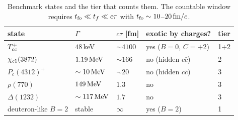 \begin{table}[t]
\caption{Benchmark states and the tier that counts them.  The countable
window requires $t_{\rm fo}\ll t_f\ll c\tau$ with
$t_{\rm fo}\sim10$--$20\,\mathrm{fm}/c$.}
\label{tab:tiers}
\begin{ruledtabular}
\begin{tabular}{lllll}
state & $\Gamma$ & $c\tau$ [fm] & exotic by charges? & tier \\
\hline
$T_{cc}^{+}$          & $48\,$keV      & $\sim4100$ & yes ($B{=}0$, $C{=}{+}2$) & 1+2 \\
$\chi_{c1}(3872)$         & $1.19\,\mathrm{MeV}$     & $\sim166$  & no (hidden $c\bar c$)     & 2 \\
$P_c(4312)^+$   & $\sim10\,\mathrm{MeV}$   & $\sim20$   & no (hidden $c\bar c$)     & 3 \\
$\rho(770)$     & $149\,\mathrm{MeV}$      & $1.3$      & no                        & 3 \\
$\Delta(1232)$  & $\sim117\,\mathrm{MeV}$  & $1.7$      & no                        & 3 \\
deuteron-like $B{=}2$ & stable   & $\infty$   & yes ($B{=}2$)             & 1 \\
\end{tabular}
\end{ruledtabular}
\end{table}
